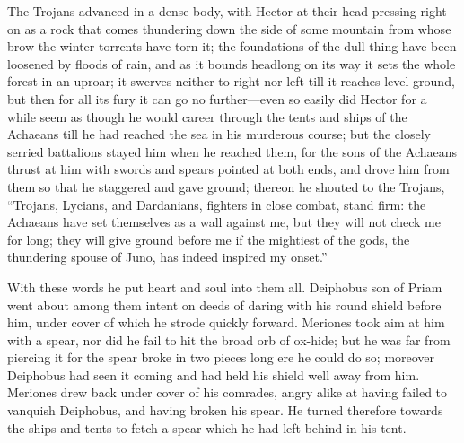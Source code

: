 The Trojans advanced in a dense body, with Hector at their head pressing
right on as a rock that comes thundering down the side of some mountain
from whose brow the winter torrents have torn it; the foundations of the
dull thing have been loosened by floods of rain, and as it bounds headlong
on its way it sets the whole forest in an uproar; it swerves neither to
right nor left till it reaches level ground, but then for all its fury it
can go no further—even so easily did Hector for a while seem as
though he would career through the tents and ships of the Achaeans till he
had reached the sea in his murderous course; but the closely serried
battalions stayed him when he reached them, for the sons of the Achaeans
thrust at him with swords and spears pointed at both ends, and drove him
from them so that he staggered and gave ground; thereon he shouted to the
Trojans, “Trojans, Lycians, and Dardanians, fighters in close combat,
stand firm: the Achaeans have set themselves as a wall against me, but
they will not check me for long; they will give ground before me if the
mightiest of the gods, the thundering spouse of Juno, has indeed inspired
my onset.”

With these words he put heart and soul into them all. Deiphobus son of
Priam went about among them intent on deeds of daring with his round
shield before him, under cover of which he strode quickly forward.
Meriones took aim at him with a spear, nor did he fail to hit the broad
orb of ox-hide; but he was far from piercing it for the spear broke in two
pieces long ere he could do so; moreover Deiphobus had seen it coming and
had held his shield well away from him. Meriones drew back under cover of
his comrades, angry alike at having failed to vanquish Deiphobus, and
having broken his spear. He turned therefore towards the ships and tents
to fetch a spear which he had left behind in his tent.

